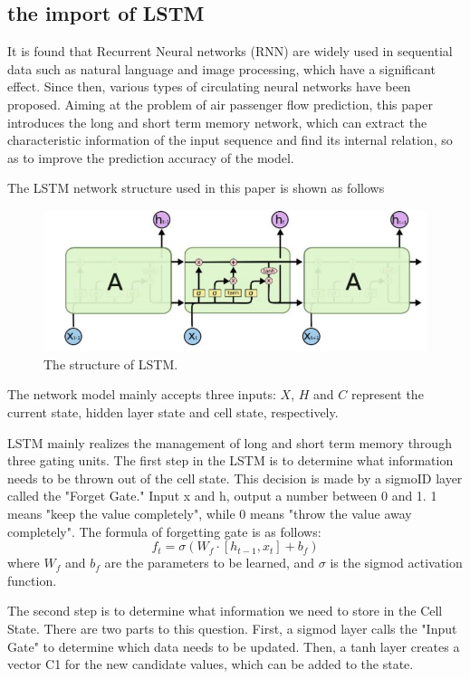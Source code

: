\documentclass[journal,article,submit,moreauthors,pdftex]{Definitions/mdpi}
\begin{document}
\subsection{the import of LSTM}
It is found that Recurrent Neural networks (RNN) are widely used in sequential data such as natural language and image processing, which have a significant effect. Since then, various types of circulating neural networks have been proposed. Aiming at the problem of air passenger flow prediction, this paper introduces the long and short term memory network, which can extract the characteristic information of the input sequence and find its internal relation, so as to improve the prediction accuracy of the model.
\par The LSTM network structure used in this paper is shown as follows
\begin{figure}
    \centering
    \includegraphics[width=8 cm]{./imgs/LSTMpng.png}
    \caption{The structure of LSTM.}
\end{figure}
The network model mainly accepts three inputs: $X$, $H$ and $C$ represent the current state, hidden layer state and cell state, respectively.
\par LSTM mainly realizes the management of long and short term memory through three gating units. The first step in the LSTM is to determine what information needs to be thrown out of the cell state. This decision is made by a sigmoID layer called the "Forget Gate." Input x and h, output a number between 0 and 1. 1 means "keep the value completely", while 0 means "throw the value away completely". The formula of forgetting gate is as follows:
\begin{equation}
    f_{t}=\sigma\left(W_{f} \cdot\left[h_{t-1}, x_{t}\right]+b_{f}\right)
\end{equation}
where $W_{f}$ and $b_{f}$ are the parameters to be learned, and $\sigma$ is the sigmod activation function.
\par The second step is to determine what information we need to store in the Cell State. There are two parts to this question. First, a sigmod layer calls the "Input Gate" to determine which data needs to be updated. Then, a tanh layer creates a vector C1 for the new candidate values, which can be added to the state.
\end{document}
